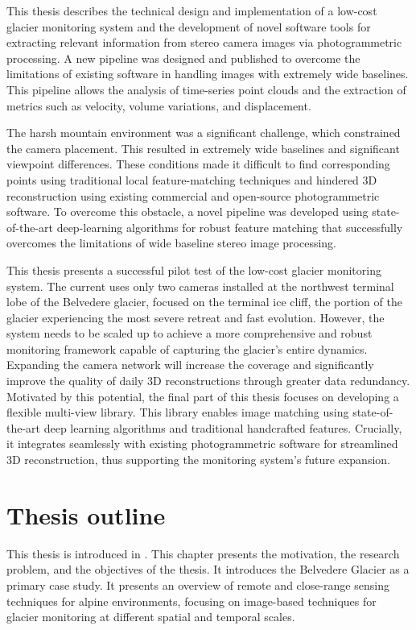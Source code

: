 This thesis describes the technical design and implementation of a low-cost glacier monitoring system and the development of novel software tools for extracting relevant information from stereo camera images via photogrammetric processing. 
A new pipeline was designed and published to overcome the limitations of existing software in handling images with extremely wide baselines. 
This pipeline allows the analysis of time-series point clouds and the extraction of metrics such as velocity, volume variations, and displacement.

The harsh mountain environment was a significant challenge, which constrained the camera placement.
This resulted in extremely wide baselines and significant viewpoint differences.  
These conditions made it difficult to find corresponding points using traditional local feature-matching techniques and hindered 3D reconstruction using existing commercial and open-source photogrammetric software.
To overcome this obstacle, a novel pipeline was developed using state-of-the-art deep-learning algorithms for robust feature matching that successfully overcomes the limitations of wide baseline stereo image processing.

This thesis presents a successful pilot test of the low-cost glacier monitoring system.
The current uses only two cameras installed at the northwest terminal lobe of the Belvedere glacier, focused on the terminal ice cliff, the portion of the glacier experiencing the most severe retreat and fast evolution. 
However, the system needs to be scaled up to achieve a more comprehensive and robust monitoring framework capable of capturing the glacier's entire dynamics. 
Expanding the camera network will increase the coverage and significantly improve the quality of daily 3D reconstructions through greater data redundancy.
Motivated by this potential, the final part of this thesis focuses on developing a flexible multi-view library. 
This library enables image matching using state-of-the-art deep learning algorithms and traditional handcrafted features. 
Crucially, it integrates seamlessly with existing photogrammetric software for streamlined 3D reconstruction, thus supporting the monitoring system's future expansion.


\section{Thesis outline}

This thesis is introduced in \textbf{}. 
This chapter presents the motivation, the research problem, and the objectives of the thesis.
It introduces the Belvedere Glacier as a primary case study. It presents an overview of remote and close-range sensing techniques for alpine environments, focusing on image-based techniques for glacier monitoring at different spatial and temporal scales.

